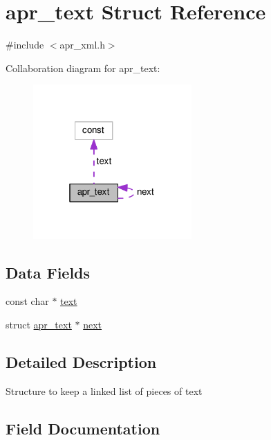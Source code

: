 \hypertarget{structapr__text}{}\section{apr\+\_\+text Struct Reference}
\label{structapr__text}


{\ttfamily \#include $<$apr\+\_\+xml.\+h$>$}



Collaboration diagram for apr\+\_\+text\+:
\nopagebreak
\begin{figure}[H]
\begin{center}
\leavevmode
\includegraphics[width=172pt]{structapr__text__coll__graph}
\end{center}
\end{figure}
\subsection*{Data Fields}
\begin{DoxyCompactItemize}
\item 
const char $\ast$ \hyperlink{structapr__text_a37a262695c36f740a7777ea9dd0b699d}{text}
\item 
struct \hyperlink{structapr__text}{apr\+\_\+text} $\ast$ \hyperlink{structapr__text_aaf1b48e3f3085522fe7355e7d8893111}{next}
\end{DoxyCompactItemize}


\subsection{Detailed Description}
Structure to keep a linked list of pieces of text 

\subsection{Field Documentation}
